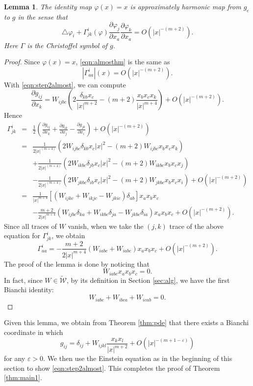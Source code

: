 \documentclass{amsart}
\newtheorem{lem}[thm]{Lemma}
\newcommand{\abs}[1]{\left\vert#1\right\vert}
\newcommand{\pfrac}[2]{\frac{\partial #1}{\partial #2}}
\numberwithin{equation}{section}
\begin{document}
\begin{lem}
	\label{lem:idapprox}
	The identity map $\varphi(x)=x$ is approximately harmonic map from $g_e$ to $g$ in the sense that
	\begin{equation}
		\label{eqn:almosthm}
		\triangle \varphi_i + \Gamma^i_{jk}(\varphi) \pfrac{\varphi_j}{x_a} \pfrac{\varphi_k}{x_a}  = O(\abs{x}^{-(m+2)}).
	\end{equation}
	Here $\Gamma$ is the Christoffel symbol of $g$.
\end{lem}
\begin{proof}
	Since $\varphi(x)=x$, \eqref{eqn:almosthm} is the same as
	\[
		\abs{\Gamma^i_{aa}}(x) = O(\abs{x}^{-(m+2)}).
	\]
	With \eqref{eqn:step2almost}, we can compute
	\[
		\pfrac{g_{ij}}{x_k}= W_{ijbc} \left( 2 \frac{\delta_{kb}x_c}{\abs{x}^{m+2}} - (m+2) \frac{x_bx_cx_k}{\abs{x}^{m+4}} \right) + O(\abs{x}^{-(m+2)}).
	\]
	Hence
	\begin{eqnarray*}
		\Gamma^i_{jk} &=& \frac{1}{2} \left( \pfrac{g_{ij}}{x_k} + \pfrac{g_{ik}}{x_j}- \pfrac{g_{jk}}{x_i} \right) + O(\abs{x}^{-(m+2)})  \\
			      &=& \frac{1}{2\abs{x}^{(m+4)}} \left( 2W_{ijbc}  \delta_{kb} x_c \abs{x}^2 - (m+2)W_{ijbc}x_bx_cx_k \right)  \\
			      && + \frac{1}{2\abs{x}^{(m+4)}} \left( 2W_{ikbc}  \delta_{jb} x_c \abs{x}^2 - (m+2)W_{ikbc}x_bx_cx_j \right)  \\
			      && - \frac{1}{2\abs{x}^{(m+4)}} \left( 2W_{jkbc}  \delta_{ib} x_c \abs{x}^2 - (m+2)W_{jkbc}x_bx_cx_i \right)  + O(\abs{x}^{-(m+2)})\\
			      &=& \frac{1}{\abs{x}^{m+4}} \left[ (W_{ijkc}+W_{ikjc}-W_{jkic})\delta_{ab}\right] x_ax_bx_c \\
			      &&- \frac{m+2}{2\abs{x}^{m+4}}(W_{ijbc}\delta_{ka} +W_{ikbc}\delta_{ja} - W_{jkbc}\delta_{ia})  x_ax_bx_c + O(\abs{x}^{-(m+2)}).
	\end{eqnarray*}
	Since all traces of $W$ vanish, when we take the $(j,k)$ trace of the above equation for $\Gamma^i_{jk}$, we obtain
	\[
		\Gamma^i_{aa}=- \frac{m+2}{2\abs{x}^{m+4}}(W_{iabc} +W_{iabc})  x_ax_bx_c + O(\abs{x}^{-(m+2)}).
	\]
	The proof of the lemma is done by noticing that 
	$$
	W_{iabc}x_ax_bx_c=0.
	$$
	In fact, since $W\in \widetilde{\mathcal W}$, by its definition in Section \ref{sec:alg}, we have the first Bianchi identity:
	$$
		W_{iabc}+W_{ibca}+W_{icab}=0.
	$$
\end{proof}
Given this lemma, we obtain from Theorem \ref{thm:pde} that there exists a Bianchi coordinate in which 
$$
	g_{ij}=\delta_{ij}+ W_{ijkl}\frac{x_kx_l}{\abs{x}^{m+2}} + O(\abs{x}^{-(m+1-\varepsilon)})
$$
for any $\varepsilon>0$. We then use the Einstein equation as in the beginning of this section to show \eqref{eqn:step2almost}. This completes the proof of Theorem \ref{thm:main1}.
\end{document}
